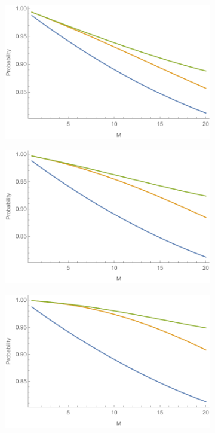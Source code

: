 \documentclass[aps,pra,twocolumn,superscriptaddress,numerical,floatfix]{revtex4-1}
\begin{document}
\begin{figure}
	\centering
	\begin{subfigure}[b]{\columnwidth}
		\includegraphics[width=1\columnwidth]{error_a.pdf}
		\caption{}
		\label{fig:Prob correct for phase systems a} 
	\end{subfigure}
	
	\begin{subfigure}[b]{\columnwidth}
		\includegraphics[width=1\columnwidth]{error_b.pdf}
		\caption{}
		\label{fig:Prob correct for phase systems b}
	\end{subfigure}
	
	\begin{subfigure}[b]{\columnwidth}
		\includegraphics[width=1\columnwidth]{error_c.pdf}
		\caption{}
		\label{fig:Prob correct for phase systems c}
	\end{subfigure}
	

\end{figure}
\end{document}
